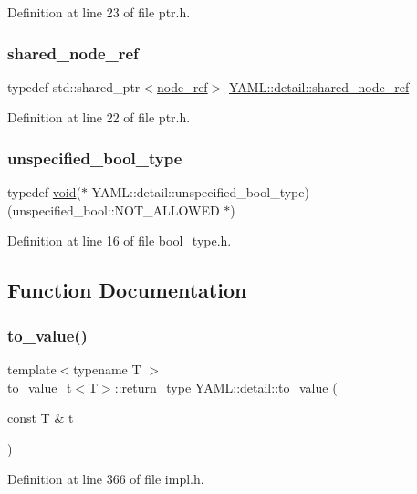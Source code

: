 Definition at line 23 of file ptr.\+h.

\mbox{\label{namespace_y_a_m_l_1_1detail_a1d98768282366a6ddc8ba83938535345}} 
\subsubsection{\texorpdfstring{shared\_node\_ref}{shared\_node\_ref}}
{\footnotesize\ttfamily typedef std\+::shared\+\_\+ptr$<$\mbox{\hyperlink{class_y_a_m_l_1_1detail_1_1node__ref}{node\+\_\+ref}}$>$ \mbox{\hyperlink{namespace_y_a_m_l_1_1detail_a1d98768282366a6ddc8ba83938535345}{Y\+A\+M\+L\+::detail\+::shared\+\_\+node\+\_\+ref}}}



Definition at line 22 of file ptr.\+h.

\mbox{\label{namespace_y_a_m_l_1_1detail_aae838a27553d3f5f39be4723ffcbe90d}} 
\subsubsection{\texorpdfstring{unspecified\_bool\_type}{unspecified\_bool\_type}}
{\footnotesize\ttfamily typedef \mbox{\hyperlink{glad_8h_a950fc91edb4504f62f1c577bf4727c29}{void}}($\ast$ Y\+A\+M\+L\+::detail\+::unspecified\+\_\+bool\+\_\+type) (unspecified\+\_\+bool\+::\+N\+O\+T\+\_\+\+A\+L\+L\+O\+W\+ED $\ast$)}



Definition at line 16 of file bool\+\_\+type.\+h.



\subsection{Function Documentation}
\mbox{\label{namespace_y_a_m_l_1_1detail_a9c6d34b859935b0df4f756b571cb6eab}} 
\subsubsection{\texorpdfstring{to\_value()}{to\_value()}}
{\footnotesize\ttfamily template$<$typename T $>$ \\
\mbox{\hyperlink{struct_y_a_m_l_1_1detail_1_1to__value__t}{to\+\_\+value\+\_\+t}}$<$T$>$\+::return\+\_\+type Y\+A\+M\+L\+::detail\+::to\+\_\+value (\begin{DoxyParamCaption}\item[{const T \&}]{t }\end{DoxyParamCaption})\hspace{0.3cm}{\ttfamily [inline]}}



Definition at line 366 of file impl.\+h.

